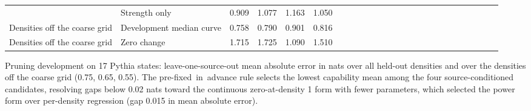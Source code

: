 \begin{table}[tb]
\begin{tabular*}{\textwidth}
{Densities off the coarse grid} & Strength only & 0.909 & 1.077 & 1.163 & 1.050 \\
{Densities off the coarse grid} & {Development median curve} & 0.758 & 0.790 & 0.901 & 0.816 \\
{Densities off the coarse grid} & Zero change & 1.715 & 1.725 & 1.090 & 1.510 \\
\bottomrule\end{tabular*}
\par\smallskip\begin{minipage}{\linewidth}\footnotesize Pruning development on 17 Pythia states: leave-one-source-out mean absolute error in nats over all \mbox{held-out} densities and over the densities off the coarse grid (0.75, 0.65, 0.55). The \mbox{pre-fixed in advance} rule selects the lowest capability mean among the four source-conditioned candidates, resolving gaps below 0.02 nats toward the continuous zero-at-density 1 form with fewer parameters, which selected the power form over per-density regression (gap 0.015 in mean absolute error).\end{minipage}
\end{table}
